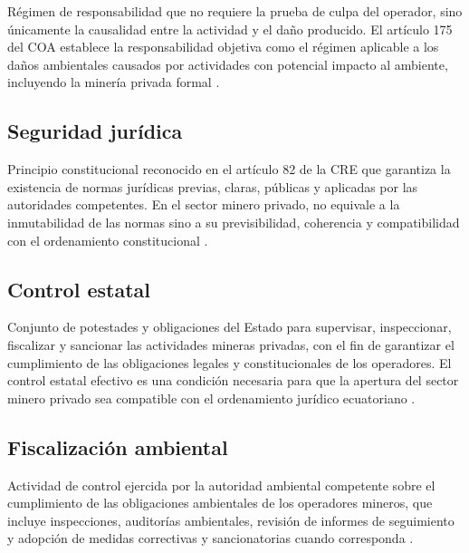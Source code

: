 Régimen de responsabilidad que no requiere la prueba de culpa del operador, sino únicamente la causalidad entre la actividad y el daño producido. El artículo 175 del COA establece la responsabilidad objetiva como el régimen aplicable a los daños ambientales causados por actividades con potencial impacto al ambiente, incluyendo la minería privada formal \parencite{coa_2017}.

\subsection{Seguridad jurídica}

Principio constitucional reconocido en el artículo 82 de la CRE que garantiza la existencia de normas jurídicas previas, claras, públicas y aplicadas por las autoridades competentes. En el sector minero privado, no equivale a la inmutabilidad de las normas sino a su previsibilidad, coherencia y compatibilidad con el ordenamiento constitucional \parencite{cre_2008,villacis_calvas_2022}.

\subsection{Control estatal}

Conjunto de potestades y obligaciones del Estado para supervisar, inspeccionar, fiscalizar y sancionar las actividades mineras privadas, con el fin de garantizar el cumplimiento de las obligaciones legales y constitucionales de los operadores. El control estatal efectivo es una condición necesaria para que la apertura del sector minero privado sea compatible con el ordenamiento jurídico ecuatoriano \parencite{ley_mineria_2025,coa_2017}.

\subsection{Fiscalización ambiental}

Actividad de control ejercida por la autoridad ambiental competente sobre el cumplimiento de las obligaciones ambientales de los operadores mineros, que incluye inspecciones, auditorías ambientales, revisión de informes de seguimiento y adopción de medidas correctivas y sancionatorias cuando corresponda \parencite{coa_2017,arcom_rendicion_cuentas_2024}.

